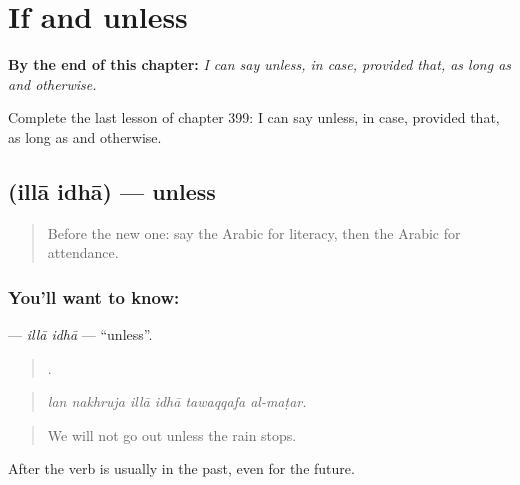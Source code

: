 
\chapter{If and unless}
\label{ch:ar-if-and-unless}

\begin{chapteropening}
\textbf{By the end of this chapter:} \emph{I can say unless, in case, provided that, as long as and otherwise.}

Complete the last lesson of chapter 399: I can say unless, in case, provided that, as long as and otherwise.
\end{chapteropening}

\section[\texorpdfstring{\ar{إلا} \ar{إذا} (illā idhā)}{إلا إذا (illā idhā)}]{  (illā idhā) — unless}

\label{lesson:AR-C399-illa-idha}



\begin{quote}
Before the new one: say the Arabic for literacy, then the Arabic for attendance.
\end{quote}

\subsection*{You'll want to know:  }
\textbf{ } — \emph{illā idhā} — \textquotedblleft{}unless\textquotedblright{}.

\begin{quote}
     .
\end{quote}

\begin{quote}
\emph{lan nakhruja illā idhā tawaqqafa al-maṭar.}
\end{quote}

\begin{quote}
We will not go out unless the rain stops.
\end{quote}

After  the verb is usually in the past, even for the future.

